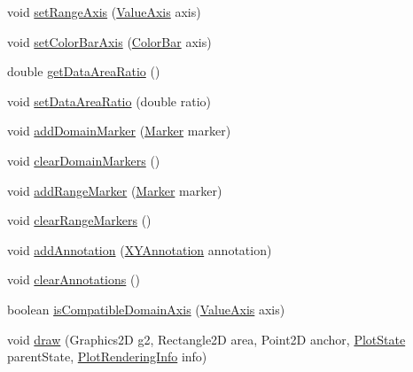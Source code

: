 \begin{DoxyCompactItemize}
\item 
void \mbox{\hyperlink{classorg_1_1jfree_1_1chart_1_1plot_1_1_contour_plot_a674549d06fd2de9505bd220e5d53bb84}{set\+Range\+Axis}} (\mbox{\hyperlink{classorg_1_1jfree_1_1chart_1_1axis_1_1_value_axis}{Value\+Axis}} axis)
\item 
void \mbox{\hyperlink{classorg_1_1jfree_1_1chart_1_1plot_1_1_contour_plot_a634131a8ad1604a30ded221269ba4597}{set\+Color\+Bar\+Axis}} (\mbox{\hyperlink{classorg_1_1jfree_1_1chart_1_1axis_1_1_color_bar}{Color\+Bar}} axis)
\item 
double \mbox{\hyperlink{classorg_1_1jfree_1_1chart_1_1plot_1_1_contour_plot_a98f307eb91af31c87506ee46fb30fb53}{get\+Data\+Area\+Ratio}} ()
\item 
void \mbox{\hyperlink{classorg_1_1jfree_1_1chart_1_1plot_1_1_contour_plot_a690d308fc4aba52538cbfa7d35322c36}{set\+Data\+Area\+Ratio}} (double ratio)
\item 
void \mbox{\hyperlink{classorg_1_1jfree_1_1chart_1_1plot_1_1_contour_plot_a2165f544a5254c42cf32f080aa3a1944}{add\+Domain\+Marker}} (\mbox{\hyperlink{classorg_1_1jfree_1_1chart_1_1plot_1_1_marker}{Marker}} marker)
\item 
void \mbox{\hyperlink{classorg_1_1jfree_1_1chart_1_1plot_1_1_contour_plot_a9c08a872e16b3b1d2ca91dc7b3e5bc2e}{clear\+Domain\+Markers}} ()
\item 
void \mbox{\hyperlink{classorg_1_1jfree_1_1chart_1_1plot_1_1_contour_plot_a83b16f53a2cf8e10a6b97e12dce21e57}{add\+Range\+Marker}} (\mbox{\hyperlink{classorg_1_1jfree_1_1chart_1_1plot_1_1_marker}{Marker}} marker)
\item 
void \mbox{\hyperlink{classorg_1_1jfree_1_1chart_1_1plot_1_1_contour_plot_ae496e30d3cbc2e2c94545808b346503e}{clear\+Range\+Markers}} ()
\item 
void \mbox{\hyperlink{classorg_1_1jfree_1_1chart_1_1plot_1_1_contour_plot_a7c1e1ba24b55d398a9e60030e6ae4475}{add\+Annotation}} (\mbox{\hyperlink{interfaceorg_1_1jfree_1_1chart_1_1annotations_1_1_x_y_annotation}{X\+Y\+Annotation}} annotation)
\item 
void \mbox{\hyperlink{classorg_1_1jfree_1_1chart_1_1plot_1_1_contour_plot_aaf083bfe4999467fac767f9232c03f60}{clear\+Annotations}} ()
\item 
boolean \mbox{\hyperlink{classorg_1_1jfree_1_1chart_1_1plot_1_1_contour_plot_a419fd817a4a6301aef1ec3328b593548}{is\+Compatible\+Domain\+Axis}} (\mbox{\hyperlink{classorg_1_1jfree_1_1chart_1_1axis_1_1_value_axis}{Value\+Axis}} axis)
\item 
void \mbox{\hyperlink{classorg_1_1jfree_1_1chart_1_1plot_1_1_contour_plot_a7dbda9fb682f0521cbbe6c3f32b74099}{draw}} (Graphics2D g2, Rectangle2D area, Point2D anchor, \mbox{\hyperlink{classorg_1_1jfree_1_1chart_1_1plot_1_1_plot_state}{Plot\+State}} parent\+State, \mbox{\hyperlink{classorg_1_1jfree_1_1chart_1_1plot_1_1_plot_rendering_info}{Plot\+Rendering\+Info}} info)

\end{DoxyCompactItemize}
